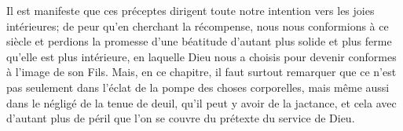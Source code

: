 Il est manifeste que ces préceptes
		dirigent toute notre intention vers les joies intérieures;
	de peur qu’en cherchant la récompense, nous nous conformions à ce siècle
	et perdions la promesse d’une béatitude
		d’autant plus solide et plus ferme qu’elle est plus intérieure,
	en laquelle Dieu nous a choisis
		pour devenir conformes à l’image de son Fils.
Mais, en ce chapitre, il faut surtout remarquer
	que ce n’est pas seulement dans l’éclat de la pompe des choses corporelles,
	mais même aussi dans le négligé de la tenue de deuil,
	qu’il peut y avoir de la jactance,
	et cela avec d’autant plus de péril
		que l’on se couvre du prétexte du service de Dieu.
